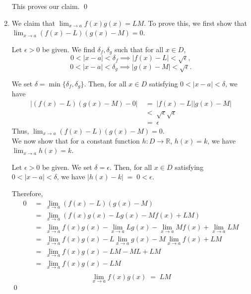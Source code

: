 \documentclass[10pt]{article}
\begin{document}
\begin{enumerate}
                This proves our claim. \qed

                \item We claim that $\lim_{x\to a} f(x)g(x) = LM$. To prove this, we first
                show that $\lim_{x \to a} (f(x) - L)(g(x) - M) = 0$.

                Let $\epsilon > 0$ be given.
                We find $\delta_f, \delta_g$ such that for all $x \in D$,
                \[0 < |x - a| < \delta_f \implies |f(x) - L| < \sqrt{\epsilon},\]
                \[0 < |x - a| < \delta_g \implies |g(x) - M| < \sqrt{\epsilon}.\]

                We set $\delta = \min\{\delta_f, \delta_g\}$.
                Then, for all $x \in D$ satisfying $0 < |x - a| < \delta$, we have
                \begin{align*}
                |(f(x) - L)(g(x) - M) - 0| \;&=\; |f(x) - L| |g(x) - M| \\
                        \;&<\; \sqrt{\epsilon} \sqrt{\epsilon} \\
                        \;&=\; \epsilon
                \end{align*}
                Thus, $\lim_{x\to a}(f(x) - L)(g(x) - M) = 0$.\\

                We now show that for a constant function $h\colon D \to \mathbb{R}$, $h(x) = k$,
                we have $\lim_{x\to a} h(x) = k$.

                Let $\epsilon > 0$ be given. We set $\delta = \epsilon$.
                Then, for all $x \in D$ satisfying $0 < |x - a| < \delta$, we have
                $
                |h(x) - k| \;=\; 0 < \epsilon.
                $
                
                Therefore,
                \begin{align*}
                        0 \;&=\;\lim_{x \to a} (f(x) - L)(g(x) - M) \\
                                \;&=\; \lim_{x \to a} (f(x)g(x) - Lg(x) - Mf(x) + LM) \\
                                \;&=\; \lim_{x \to a} f(x)g(x) - \lim_{x \to a} Lg(x) - \lim_{x \to a}Mf(x) + \lim_{x \to a} LM \\
                                \;&=\; \lim_{x \to a} f(x)g(x) - L\lim_{x \to a} g(x) - M\lim_{x \to a}f(x) +  LM \\
                                \;&=\; \lim_{x \to a} f(x)g(x) - LM - ML + LM \\
                                \;&=\; \lim_{x \to a} f(x)g(x) - LM \\
                \end{align*}
                \[
                        \lim_{x \to a} f(x)g(x) \;=\; LM
                \]\qed


\end{enumerate}
\end{document}

